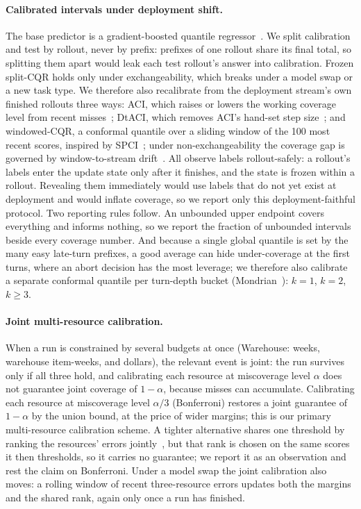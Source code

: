 \documentclass{article}
\begin{document}
\paragraph{Calibrated intervals under deployment shift.}
The base predictor is a gradient-boosted quantile regressor~\cite{ke2017lightgbm}. We split calibration and test by rollout, never by prefix: prefixes of one rollout share its final total, so splitting them apart would leak each test rollout's answer into calibration. Frozen split-CQR holds only under exchangeability, which breaks under a model swap or a new task type. We therefore also recalibrate from the deployment stream's own finished rollouts three ways: ACI, which raises or lowers the working coverage level from recent misses~\cite{gibbs2021aci}; DtACI, which removes ACI's hand-set step size~\cite{gibbs2024dtaci}; and windowed-CQR, a conformal quantile over a sliding window of the 100 most recent scores, inspired by SPCI~\cite{xu2023spci}; under non-exchangeability the coverage gap is governed by window-to-stream drift~\cite{barber2023beyond}. All observe labels rollout-safely: a rollout's labels enter the update state only after it finishes, and the state is frozen within a rollout. Revealing them immediately would use labels that do not yet exist at deployment and would inflate coverage, so we report only this deployment-faithful protocol. Two reporting rules follow. An unbounded upper endpoint covers everything and informs nothing, so we report the fraction of unbounded intervals beside every coverage number. And because a single global quantile is set by the many easy late-turn prefixes, a good average can hide under-coverage at the first turns, where an abort decision has the most leverage; we therefore also calibrate a separate conformal quantile per turn-depth bucket (Mondrian~\cite{vovk2012conditional}): $k{=}1$, $k{=}2$, $k{\ge}3$.

\paragraph{Joint multi-resource calibration.}
When a run is constrained by several budgets at once (Warehouse: weeks, warehouse item-weeks, and dollars), the relevant event is joint: the run survives only if all three hold, and calibrating each resource at miscoverage level $\alpha$ does not guarantee  joint coverage of $1-\alpha$, because misses can accumulate. Calibrating each resource at miscoverage level $\alpha/3$ (Bonferroni) restores a joint guarantee of $1{-}\alpha$ by the union bound, at the price of wider margins; this is our primary multi-resource calibration scheme. A tighter alternative shares one threshold by ranking the resources' errors jointly~\cite{messoudi2021copula}, but that rank is chosen on the same scores it then thresholds, so it carries no guarantee; we report it as an observation and rest the claim on Bonferroni. Under a model swap the joint calibration also moves: a rolling window of recent three-resource errors updates both the margins and the shared rank, again only once a run has finished.
\end{document}
